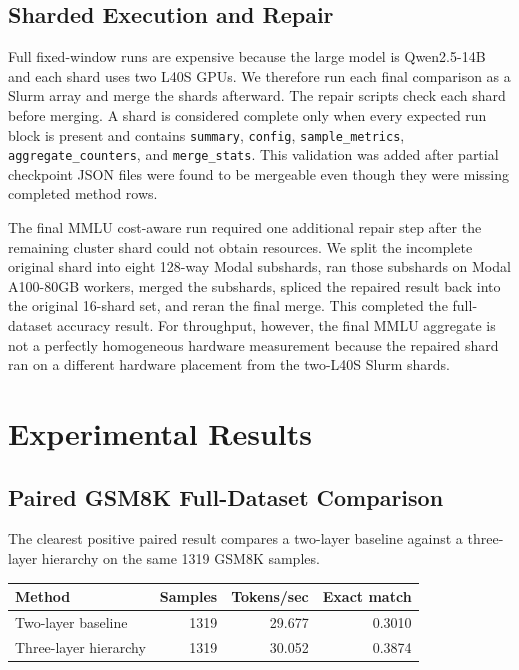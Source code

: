 \documentclass[11pt]{article}
\begin{document}
\subsection{Sharded Execution and Repair}

Full fixed-window runs are expensive because the large model is Qwen2.5-14B and each shard uses two L40S GPUs. We therefore run each final comparison as a Slurm array and merge the shards afterward. The repair scripts check each shard before merging. A shard is considered complete only when every expected run block is present and contains \texttt{summary}, \texttt{config}, \texttt{sample\_metrics}, \texttt{aggregate\_counters}, and \texttt{merge\_stats}. This validation was added after partial checkpoint JSON files were found to be mergeable even though they were missing completed method rows.

The final MMLU cost-aware run required one additional repair step after the remaining cluster shard could not obtain resources. We split the incomplete original shard into eight 128-way Modal subshards, ran those subshards on Modal A100-80GB workers, merged the subshards, spliced the repaired result back into the original 16-shard set, and reran the final merge. This completed the full-dataset accuracy result. For throughput, however, the final MMLU aggregate is not a perfectly homogeneous hardware measurement because the repaired shard ran on a different hardware placement from the two-L40S Slurm shards.

\section{Experimental Results}

\subsection{Paired GSM8K Full-Dataset Comparison}

The clearest positive paired result compares a two-layer baseline against a three-layer hierarchy on the same 1319 GSM8K samples.

\begin{center}
\begin{tabular}{lrrr}
\toprule
Method & Samples & Tokens/sec & Exact match \\
\midrule
Two-layer baseline & 1319 & 29.677 & 0.3010 \\
Three-layer hierarchy & 1319 & 30.052 & 0.3874 \\
\bottomrule
\end{tabular}
\end{center}
\end{document}
